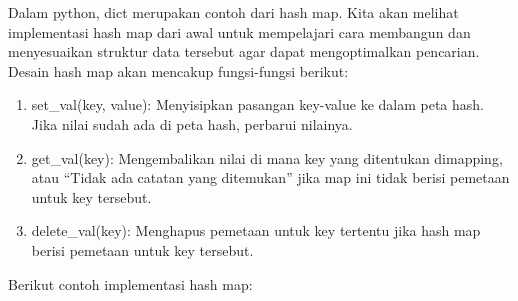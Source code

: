 Dalam python, dict merupakan contoh dari hash map. Kita akan melihat implementasi hash map dari awal untuk mempelajari cara membangun dan menyesuaikan struktur data tersebut agar dapat mengoptimalkan pencarian.
Desain hash map akan mencakup fungsi-fungsi berikut:
\begin{enumerate}

\item set\_val(key, value): Menyisipkan pasangan key-value ke dalam peta hash. Jika nilai sudah ada di peta hash, perbarui nilainya.

\item get\_val(key): Mengembalikan nilai di mana key yang ditentukan dimapping, atau “Tidak ada catatan yang ditemukan” jika map ini tidak berisi pemetaan untuk key tersebut.

\item delete\_val(key): Menghapus pemetaan untuk key tertentu jika hash map berisi pemetaan untuk key tersebut.
\end{enumerate}
Berikut contoh implementasi hash map:
